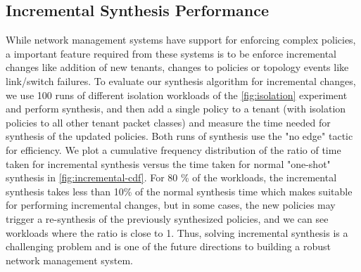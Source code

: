 \subsection{Incremental Synthesis Performance} \label{sec:incrementaleval}
While network management systems have support for enforcing complex policies, 
a important feature required from these systems is to be enforce incremental changes
like addition of new tenants, changes to policies or topology events like link/switch 
failures. To evaluate our synthesis algorithm for incremental changes, we use 100 runs of 
different isolation workloads of the \cref{fig:isolation} experiment and perform synthesis, and then
add a single policy to a tenant (with isolation policies to all other tenant packet classes) and
measure the time needed for synthesis of the updated policies. Both runs of synthesis use the
"no edge" tactic for efficiency. We plot a cumulative frequency 
distribution of the ratio of time taken for incremental synthesis versus the time taken for normal 
"one-shot" synthesis in \cref{fig:incremental-cdf}. For 80 \% of the workloads, the incremental 
synthesis takes less than 10\% of the normal synthesis time which makes \Name suitable for 
performing incremental changes, but in some cases, the new policies may trigger a re-synthesis 
of the previously synthesized policies, and we can see workloads where the ratio is close to 1. 
Thus, solving incremental synthesis is a challenging problem and is one of the future directions
to building a robust network management system. 

%
%

